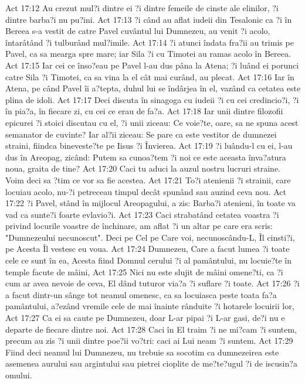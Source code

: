 Act 17:12  Au crezut mul?i dintre ei ?i dintre femeile de cinste ale elinilor, ?i dintre barba?i nu pu?ini.
Act 17:13  ?i când au aflat iudeii din Tesalonic ca ?i în Bereea s-a vestit de catre Pavel cuvântul lui Dumnezeu, au venit ?i acolo, întarâtând ?i tulburând mul?imile.
Act 17:14  ?i atunci îndata fra?ii au trimis pe Pavel, ca sa mearga spre mare; iar Sila ?i cu Timotei au ramas acolo în Bereea.
Act 17:15  Iar cei ce înso?eau pe Pavel l-au dus pâna la Atena; ?i luând ei porunci catre Sila ?i Timotei, ca sa vina la el cât mai curând, au plecat.
Act 17:16  Iar în Atena, pe când Pavel îi a?tepta, duhul lui se îndârjea în el, vazând ca cetatea este plina de idoli.
Act 17:17  Deci discuta în sinagoga cu iudeii ?i cu cei credincio?i, ?i în pia?a, în fiecare zi, cu cei ce erau de fa?a.
Act 17:18  Iar unii dintre filozofii epicurei ?i stoici discutau cu el, ?i unii ziceau: Ce voie?te, oare, sa ne spuna acest semanator de cuvinte? Iar al?ii ziceau: Se pare ca este vestitor de dumnezei straini, fiindca bineveste?te pe Iisus ?i Învierea.
Act 17:19  ?i luându-l cu ei, l-au dus în Areopag, zicând: Putem sa cunoa?tem ?i noi ce este aceasta înva?atura noua, graita de tine?
Act 17:20  Caci tu aduci la auzul nostru lucruri straine. Voim deci sa ?tim ce vor sa fie acestea.
Act 17:21  To?i atenienii ?i strainii, care locuiau acolo, nu-?i petreceau timpul decât spunând sau auzind ceva nou.
Act 17:22  ?i Pavel, stând în mijlocul Areopagului, a zis: Barba?i atenieni, în toate va vad ca sunte?i foarte evlavio?i.
Act 17:23  Caci strabatând cetatea voastra ?i privind locurile voastre de închinare, am aflat ?i un altar pe care era scris: "Dumnezeului necunoscut". Deci pe Cel pe Care voi, necunoscându-L, Îl cinsti?i, pe Acesta Îl vestesc eu voua.
Act 17:24  Dumnezeu, Care a facut lumea ?i toate cele ce sunt în ea, Acesta fiind Domnul cerului ?i al pamântului, nu locuie?te în temple facute de mâini,
Act 17:25  Nici nu este slujit de mâini omene?ti, ca ?i cum ar avea nevoie de ceva, El dând tuturor via?a ?i suflare ?i toate.
Act 17:26  ?i a facut dintr-un sânge tot neamul omenesc, ca sa locuiasca peste toata fa?a pamântului, a?ezând vremile cele de mai înainte rânduite ?i hotarele locuirii lor,
Act 17:27  Ca ei sa caute pe Dumnezeu, doar L-ar pipai ?i L-ar gasi, de?i nu e departe de fiecare dintre noi.
Act 17:28  Caci în El traim ?i ne mi?cam ?i suntem, precum au zis ?i unii dintre poe?ii vo?tri: caci ai Lui neam ?i suntem.
Act 17:29  Fiind deci neamul lui Dumnezeu, nu trebuie sa socotim ca dumnezeirea este asemenea aurului sau argintului sau pietrei cioplite de me?te?ugul ?i de iscusin?a omului.
